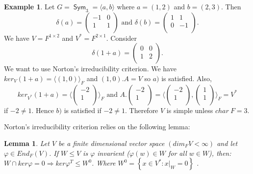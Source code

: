 \documentclass[12pt]{amsart}
\newtheorem{lemma}[theorem]{Lemma}
\theoremstyle{definition}
\newtheorem{example}[theorem]{Example}
\DeclareMathOperator{\Sym}{\mathsf{Sym}}
\begin{document}
\begin{example}
Let $G=\Sym_3=\langle a, b\rangle$ where $a=(1,2)$ and $b=(2,3)$.  Then
$$\delta(a)=\left(\begin{array}{cc}
-1  & 0 \\
1 & 1 \\
\end{array}\right)
\textrm{ and }
\delta(b)=\left(\begin{array}{cc}
1  & 1 \\
0 & -1 \\
\end{array}\right).$$
We have $V=F^{1\times 2}$ and $V^*=F^{2\times 1}$.  Consider
$$\delta(1+a)=\left(\begin{array}{cc}
0  & 0 \\
1 & 2 \\
\end{array}\right).$$
We want to use Norton's irreducibility criterion.  We have $ker_V(1+a)=\langle(1,0)\rangle_F$ and $(1,0).A=V$ so $a)$ is satisfied.  Also,
$$ker_{V^*}(1+a)=\langle\left(\begin{array}{c} -2 \\ 1 \\ \end{array}\right)\rangle_F\textrm{ and }A.\left(\begin{array}{c} -2 \\ 1 \\ \end{array}\right)=\langle\left(\begin{array}{c} -2 \\ 1 \\ \end{array}\right), \left(\begin{array}{c} 1 \\ 1 \\ \end{array}\right)\rangle_F=V^*$$
if $-2\neq 1$. Hence $b)$ is satisfied if $-2\neq 1$.  Therefore $V$ is simple unless $char\ F=3$.
\end{example}

Norton's irreducibility criterion relies on the following lemma:

\begin{lemma} \label{pre}
Let $V$ be a finite dimensional vector space $\left( dim_{F} V < \infty \right)$ and let $\varphi \in End_{F} (V)$. If $W \leq V$ is $\varphi$ invarient ($\varphi (w) \in W$ for all $w \in W$), then: $W \cap ker \varphi = 0 \Rightarrow ker \varphi^{T} \leq W^{0}$. Where $W^{0} = \left\{ x \in V^{\ast} : x|_{W} = 0 \right\} $ .
\end{lemma}
\end{document}
